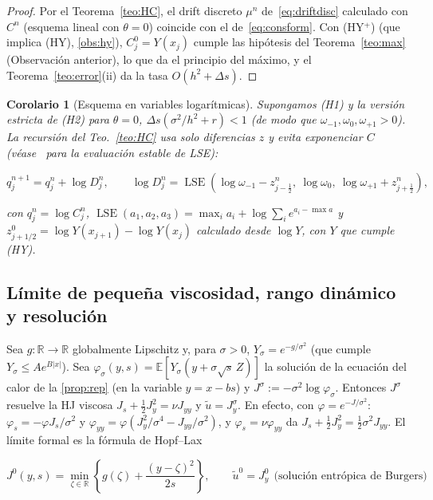 \documentclass[11pt,letterpaper]{article}
\theoremstyle{plain}
\newtheorem{corolario}[theorem]{Corolario}
\theoremstyle{definition}
\theoremstyle{remark}
\numberwithin{equation}{section}
\newcommand{\R}{\mathbb{R}}
\newcommand{\E}{\mathbb{E}}
\DeclareMathOperator{\LSE}{LSE}
\begin{document}
	\begin{proof}
		Por el Teorema~\ref{teo:HC}, el drift discreto \(\mu^n\) de~\eqref{eq:driftdisc} calculado con \(C^n\) (esquema lineal con \(\theta=0\)) coincide con el de~\eqref{eq:consform}. Con (HY\(^+\)) (que implica (HY), \cref{obs:hy}), \(C^0_j=Y(x_j)\) cumple las hipótesis del Teorema~\ref{teo:max} (Observación anterior), lo que da el principio del máximo, y el Teorema~\ref{teo:error}(ii) da la tasa \(O(h^2+\Delta s)\).
	\end{proof}
	
	\begin{corolario}[Esquema en variables logarítmicas]\label{cor:lse}
		Supongamos (H1) y la versión estricta de (H2) para \(\theta=0\), \(\Delta s(\sigma^2/h^2+r)<1\) (de modo que \(\omega_{-1},\omega_0,\omega_{+1}>0\)). La recursión del Teo.~\ref{teo:HC} usa solo diferencias \(z\) y evita exponenciar \(C\) (véase~\cite{BlanchardHigham2021} para la evaluación estable de LSE):
		
		\[
		q^{n+1}_j=q^n_j+\log D^n_j,\qquad \log D^n_j=\LSE\!\left(\log \omega_{-1}-z^n_{j-\frac12},\ \log \omega_0,\ \log \omega_{+1}+z^n_{j+\frac12}\right),
		\]
		
		con \(q^n_j=\log C^n_j\), \(\LSE(a_1,a_2,a_3)=\max_ia_i+\log\sum_ie^{a_i-\max a}\) y \(z^0_{j+1/2}=\log Y(x_{j+1})-\log Y(x_j)\) calculado desde \(\log Y\), con \(Y\) que cumple (HY).
	\end{corolario}
	
	\subsection{Límite de pequeña viscosidad, rango dinámico y resolución}\label{subsec:limite}
	
	Sea \(g:\R\to\R\) globalmente Lipschitz y, para \(\sigma>0\), \(Y_\sigma=e^{-g/\sigma^2}\) (que cumple \(Y_\sigma\le Ae^{B|x|}\)). Sea \(\varphi_\sigma(y,s)=\E[Y_\sigma(y+\sigma\sqrt s\,Z)]\) la solución de la ecuación del calor de la \cref{prop:rep} (en la variable \(y=x-bs\)) y \(J^\sigma:=-\sigma^2\log\varphi_\sigma\). Entonces \(J^\sigma\) resuelve la HJ viscosa \(J_s+\frac12J_y^2=\nu J_{yy}\) y \(\tilde u=J^\sigma_y\). En efecto, con \(\varphi=e^{-J/\sigma^2}\): \(\varphi_s=-\varphi J_s/\sigma^2\) y \(\varphi_{yy}=\varphi(J_y^2/\sigma^4-J_{yy}/\sigma^2)\), y \(\varphi_s=\nu\varphi_{yy}\) da \(J_s+\frac12J_y^2=\frac12\sigma^2J_{yy}\). El límite formal es la fórmula de Hopf--Lax
	
	\begin{equation}\label{eq:HL}
		J^0(y,s)=\min_{\zeta\in\R}\left\{g(\zeta)+\frac{(y-\zeta)^2}{2s}\right\},\qquad \tilde u^0=J^0_y\ \ \text{(solución entrópica de Burgers)}
	\end{equation}
	
\end{document}
